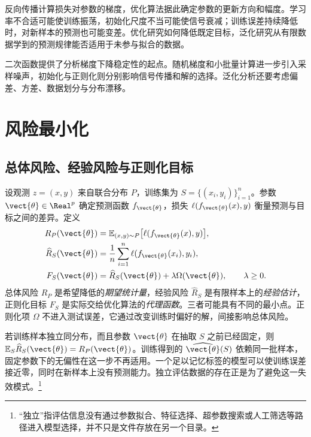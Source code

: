 \documentclass[../textbook.tex]{subfiles}
\begin{document}
\fi
{}

反向传播计算损失对参数的梯度，优化算法据此确定参数的更新方向和幅度。学习率不合适可能使训练振荡，初始化尺度不当可能使信号衰减；训练误差持续降低时，对新样本的预测也可能变差。优化研究如何降低既定目标，泛化研究从有限数据学到的预测规律能否适用于未参与拟合的数据。

二次函数提供了分析梯度下降稳定性的起点。随机梯度和小批量计算进一步引入采样噪声，初始化与正则化则分别影响信号传播和解的选择。泛化分析还要考虑偏差、方差、数据划分与分布漂移。

\section{风险最小化}

\subsection{总体风险、经验风险与正则化目标}
设观测 $z=(x,y)$ 来自联合分布 $P$，训练集为 $S=\{(x_i,y_i)\}_{i=1}^{n}$。参数 $\vect{\theta}\in\Real^p$ 确定预测函数 $f_{\vect{\theta}}$，损失 $\ell(f_{\vect{\theta}}(x),y)$ 衡量预测与目标之间的差异。定义
\begin{align}
 R_P(\vect{\theta})&=\mathbb E_{(x,y)\sim P}\bigl[\ell(f_{\vect{\theta}}(x),y)\bigr],\label{eq:opt-population}\\
 \widehat R_S(\vect{\theta})&=\frac1n\sum_{i=1}^{n}\ell(f_{\vect{\theta}}(x_i),y_i),\label{eq:opt-empirical}\\
 F_S(\vect{\theta})&=\widehat R_S(\vect{\theta})+\lambda\Omega(\vect{\theta}),\qquad\lambda\geq0.\label{eq:opt-regularized}
\end{align}
总体风险 $R_P$ 是希望降低的\emph{期望统计量}，经验风险 $\widehat R_S$ 是有限样本上的\emph{经验估计}，正则化目标 $F_S$ 是实际交给优化算法的\emph{代理函数}。三者可能具有不同的最小点。正则化项 $\Omega$ 不进入测试误差，它通过改变训练时偏好的解，间接影响总体风险。

若训练样本独立同分布，而且参数 $\vect{\theta}$ 在抽取 $S$ 之前已经固定，则 $\mathbb E_S\widehat R_S(\vect{\theta})=R_P(\vect{\theta})$。训练得到的 $\widehat{\vect{\theta}}(S)$ 依赖同一批样本，固定参数下的无偏性在这一步不再适用。一个足以记忆标签的模型可以使训练误差接近零，同时在新样本上没有预测能力。独立评估数据的存在正是为了避免这一失效模式。\footnote{“独立”指评估信息没有通过参数拟合、特征选择、超参数搜索或人工筛选等路径进入模型选择，并不只是文件存放在另一个目录。}
\end{document}
